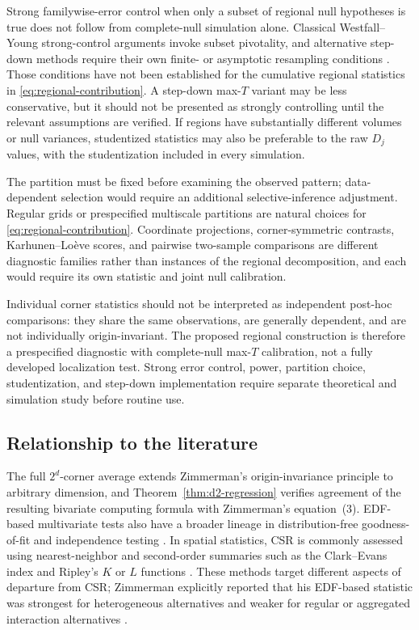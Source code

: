 \documentclass[pdflatex]{sn-jnl}
\theoremstyle{thmstyleone}
\theoremstyle{thmstyletwo}
\theoremstyle{thmstylethree}
\begin{document}
Strong familywise-error control when only a subset of regional null hypotheses is true does not follow from complete-null simulation alone. Classical Westfall--Young strong-control arguments invoke subset pivotality, and alternative step-down methods require their own finite- or asymptotic resampling conditions \cite{WestfallYoung1993,RomanoWolf2005,WestfallTroendle2008}. Those conditions have not been established for the cumulative regional statistics in \eqref{eq:regional-contribution}. A step-down max-$T$ variant may be less conservative, but it should not be presented as strongly controlling until the relevant assumptions are verified. If regions have substantially different volumes or null variances, studentized statistics may also be preferable to the raw $D_j$ values, with the studentization included in every simulation.

The partition must be fixed before examining the observed pattern; data-dependent selection would require an additional selective-inference adjustment. Regular grids or prespecified multiscale partitions are natural choices for \eqref{eq:regional-contribution}. Coordinate projections, corner-symmetric contrasts, Karhunen--Lo\`eve scores, and pairwise two-sample comparisons are different diagnostic families rather than instances of the regional decomposition, and each would require its own statistic and joint null calibration.

Individual corner statistics should not be interpreted as independent post-hoc comparisons: they share the same observations, are generally dependent, and are not individually origin-invariant. The proposed regional construction is therefore a prespecified diagnostic with complete-null max-$T$ calibration, not a fully developed localization test. Strong error control, power, partition choice, studentization, and step-down implementation require separate theoretical and simulation study before routine use.

\subsection{Relationship to the literature}

The full $2^d$-corner average extends Zimmerman's origin-invariance principle \cite{Zimmerman1993} to arbitrary dimension, and Theorem~\ref{thm:d2-regression} verifies agreement of the resulting bivariate computing formula with Zimmerman's equation~(3). EDF-based multivariate tests also have a broader lineage in distribution-free goodness-of-fit and independence testing \cite{BlumKieferRosenblatt1961,ChiuLiu2009}. In spatial statistics, CSR is commonly assessed using nearest-neighbor and second-order summaries such as the Clark--Evans index and Ripley's $K$ or $L$ functions \cite{ClarkEvans1954,Ripley1977,Diggle2003,BaddeleyRubakTurner2015}. These methods target different aspects of departure from CSR; Zimmerman explicitly reported that his EDF-based statistic was strongest for heterogeneous alternatives and weaker for regular or aggregated interaction alternatives \cite{Zimmerman1993}.
\end{document}
